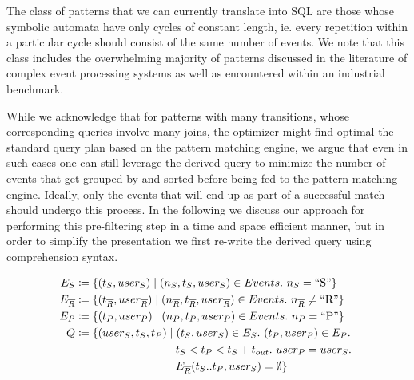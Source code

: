 The class of patterns that we can currently translate into SQL are those whose
symbolic automata have only cycles of constant length, ie. every repetition
within a particular cycle should consist of the same number of events. 
We note that this class includes the overwhelming majority of patterns discussed
in the literature of complex event processing systems as well as encountered
within an industrial benchmark.

While we acknowledge that for patterns with many transitions, whose
corresponding queries involve many joins, the optimizer might find optimal the
standard query plan based on the pattern matching engine,
we argue that even in such cases one can still leverage the derived query to
minimize the number of events that get grouped by and sorted before being fed to
the pattern matching engine.
Ideally, only the events that will end up as part of a successful match should
undergo this process.
In the following we discuss our approach for performing this pre-filtering step
in a time and space efficient manner, but in order to simplify the presentation
we first re-write the derived query using comprehension syntax.

\begin{align*}
E_S 
&\coloneq 
\{ (t_S, user_S) \mid 
   (n_S, t_S, user_S) \in Events .\ n_S = \text{``S''}
\}
\\
E_{\oR} 
&\coloneq 
\{ (t_{\oR}, user_{\oR}) \mid 
   (n_{\oR}, t_{\oR}, user_{\oR}) \in Events .\ n_{\oR} \neq \text{``R''}
\}
\\
E_P 
&\coloneq 
\{ (t_P, user_P) \mid 
   (n_P, t_P, user_P) \in Events .\ n_P = \text{``P''}
\}
\\
Q 
&\coloneq 
\{ (user_S, t_S, t_P) \mid 
   (t_S, user_S) \in E_S .\ 
   (t_P, user_P) \in E_P .\
\\ 
&\qqqquad\quad
    t_S < t_P < t_S + t_{out} .\ 
	user_P = user_S .\ 
\\
&\qqqquad\quad
	E_{\oR}(t_S..t_P, user_S) = \emptyset  
\}
\\
\end{align*}



